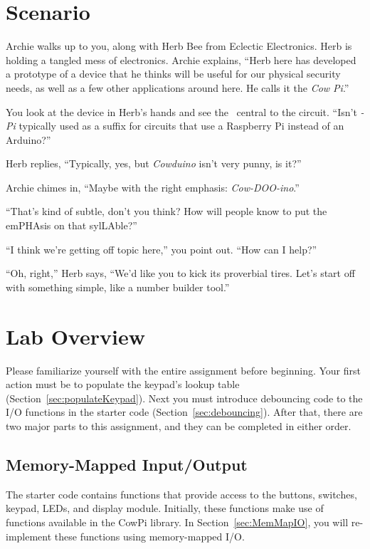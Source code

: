 \section{Scenario}

Archie walks up to you, along with Herb Bee from Eclectic Electronics. Herb is
holding a tangled mess of electronics. Archie explains, ``Herb here has
developed a prototype of a device that he thinks will be useful for our
physical security needs, as well as a few other applications around here. He
calls it the \textit{Cow Pi}.''

You look at the device in Herb's hands and see the \nano\ central to the circuit. ``Isn't \textit{-Pi} typically used as a suffix for circuits that use a Raspberry Pi instead of an Arduino?''

Herb replies, ``Typically, yes, but \textit{Cowduino} isn't very punny, is it?''

Archie chimes in, ``Maybe with the right emphasis: \textit{Cow-DOO-ino}.''

``That's kind of subtle, don't you think? How will people know to put the
emPHAsis on that sylLAble?''

``I think we're getting off topic here,'' you point out. ``How can I help?''

``Oh, right,'' Herb says, ``We'd like you to kick its proverbial tires. Let's
start off with something simple, like a number builder tool.''


\section{Lab Overview}

Please familiarize yourself with the entire assignment before beginning.
Your first action must be to populate the keypad's lookup table (Section~\ref{sec:populateKeypad}).
Next you must introduce debouncing code to the I/O functions in the starter code (Section~\ref{sec:debouncing}).
After that, there are two major parts to this assignment, and they can be completed in either order.

\subsection{Memory-Mapped Input/Output}

The starter code contains functions that provide access to the buttons, switches, keypad, LEDs, and display module.
Initially, these functions make use of functions available in the CowPi library.
In Section~\ref{sec:MemMapIO}, you will re-implement these functions using memory-mapped I/O.

